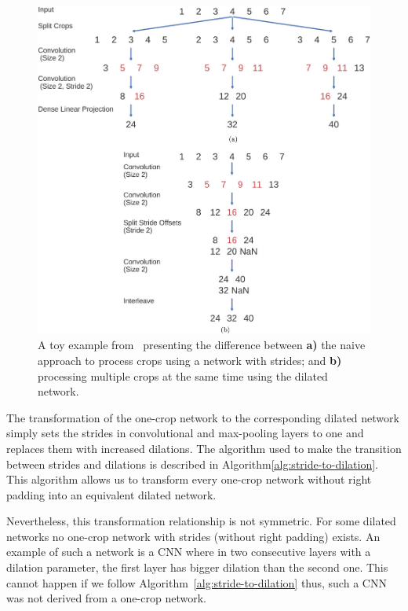\begin{figure}[!htbp]
\centering
\includegraphics[width=\linewidth]{img/ch3/cropped-decoding-scheme}
\caption[Processing crops]{A toy example from~\cite{schirrmeister-deep-2017} presenting the difference between \textbf{a)} the naive approach to process crops using a network with strides; and \textbf{b)} processing multiple crops at the same time using the dilated network.}
\label{fig:cropped-decoding-scheme}
\end{figure}

The transformation of the one-crop network to the corresponding dilated network simply sets the strides in convolutional and max-pooling layers to one and replaces them with increased dilations.
The algorithm used to make the transition between strides and dilations is described in Algorithm\ref{alg:stride-to-dilation}. This algorithm allows us to transform every one-crop network without right padding into an equivalent dilated network.

Nevertheless, this transformation relationship is not symmetric.
For some dilated networks no one-crop network with strides (without right padding) exists.
An example of such a network is a CNN where in two consecutive layers with a dilation parameter, the first layer has bigger dilation than the second one.
This cannot happen if we follow Algorithm~\ref{alg:stride-to-dilation} thus, such a CNN was not derived from a one-crop network.

